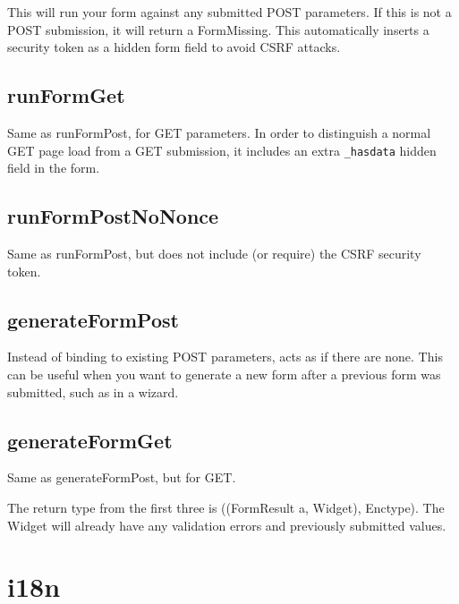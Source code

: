 This will run your form against any submitted POST parameters. If this is not a POST
submission, it will return a FormMissing. This automatically inserts a security token as a
hidden form field to avoid CSRF attacks.

\subsection{runFormGet}

Same as runFormPost, for GET parameters. In order to distinguish a normal GET page load
from a GET submission, it includes an extra \lstinline'_hasdata' hidden field in the form.

\subsection{runFormPostNoNonce}

Same as runFormPost, but does not include (or require) the CSRF security token.

\subsection{generateFormPost}

Instead of binding to existing POST parameters, acts as if there are none. This can be
useful when you want to generate a new form after a previous form was submitted, such as
in a wizard.

\subsection{generateFormGet}

Same as generateFormPost, but for GET.

The return type from the first three is ((FormResult a, Widget), Enctype). The Widget will
already have any validation errors and previously submitted values.

\section{i18n}

